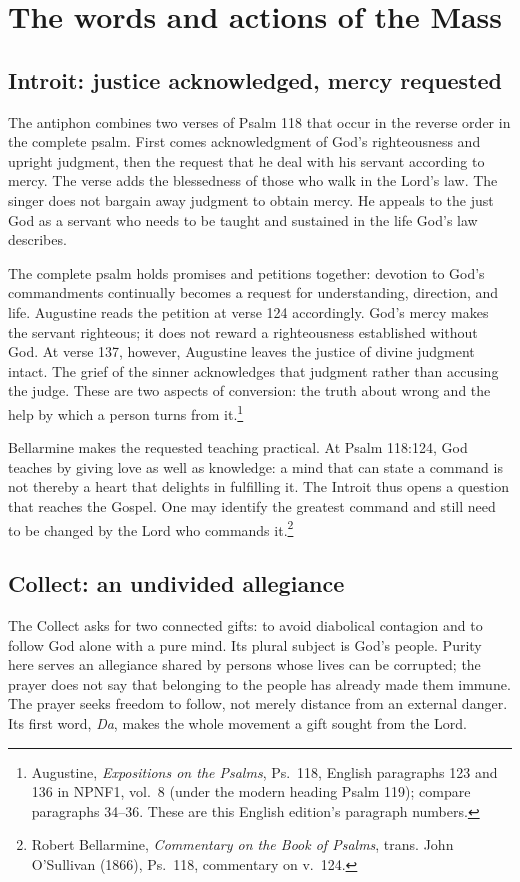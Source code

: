 \section{The words and actions of the Mass}

\subsection{Introit: justice acknowledged, mercy requested}
The antiphon combines two verses of Psalm 118 that occur in the reverse order in the complete psalm. First comes acknowledgment of God's righteousness and upright judgment, then the request that he deal with his servant according to mercy. The verse adds the blessedness of those who walk in the Lord's law. The singer does not bargain away judgment to obtain mercy. He appeals to the just God as a servant who needs to be taught and sustained in the life God's law describes.

The complete psalm holds promises and petitions together: devotion to God's commandments continually becomes a request for understanding, direction, and life. Augustine reads the petition at verse 124 accordingly. God's mercy makes the servant righteous; it does not reward a righteousness established without God. At verse 137, however, Augustine leaves the justice of divine judgment intact. The grief of the sinner acknowledges that judgment rather than accusing the judge. These are two aspects of conversion: the truth about wrong and the help by which a person turns from it.\footnote{Augustine, \textit{Expositions on the Psalms}, Ps.~118, English paragraphs 123 and 136 in NPNF1, vol.~8 (under the modern heading Psalm 119); compare paragraphs 34--36. These are this English edition's paragraph numbers.}

Bellarmine makes the requested teaching practical. At Psalm 118:124, God teaches by giving love as well as knowledge: a mind that can state a command is not thereby a heart that delights in fulfilling it. The Introit thus opens a question that reaches the Gospel. One may identify the greatest command and still need to be changed by the Lord who commands it.\footnote{Robert Bellarmine, \textit{Commentary on the Book of Psalms}, trans. John O'Sullivan (1866), Ps.~118, commentary on v.~124.}

\subsection{Collect: an undivided allegiance}
The Collect asks for two connected gifts: to avoid diabolical contagion and to follow God alone with a pure mind. Its plural subject is God's people. Purity here serves an allegiance shared by persons whose lives can be corrupted; the prayer does not say that belonging to the people has already made them immune. The prayer seeks freedom to follow, not merely distance from an external danger. Its first word, \textit{Da}, makes the whole movement a gift sought from the Lord.

